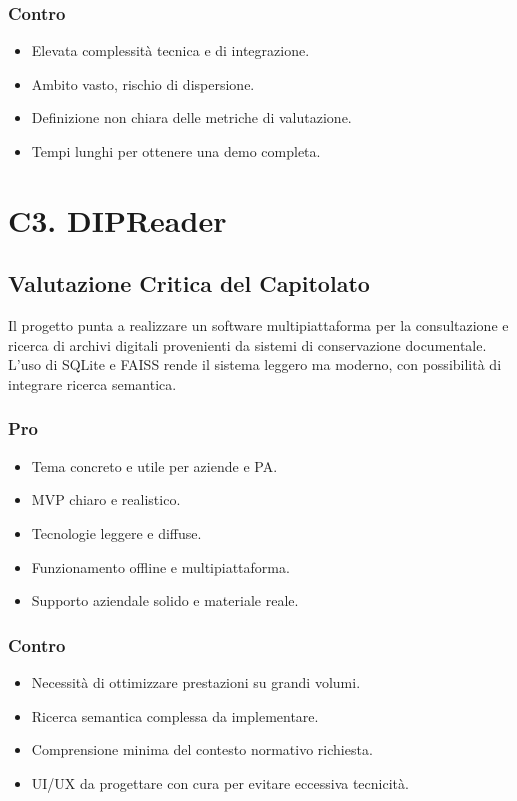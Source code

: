 \documentclass[a4paper, 11pt, oneside]{scrartcl} %
\begin{document}
\subsubsection*{Contro}
\begin{itemize}
    \item Elevata complessità tecnica e di integrazione.
    \item Ambito vasto, rischio di dispersione.
    \item Definizione non chiara delle metriche di valutazione.
    \item Tempi lunghi per ottenere una demo completa.
\end{itemize}

\section{C3. DIPReader}
\subsection*{Valutazione Critica del Capitolato}
Il progetto punta a realizzare un software multipiattaforma per la consultazione e ricerca di archivi digitali provenienti da sistemi di conservazione documentale.\\
L’uso di SQLite e FAISS rende il sistema leggero ma moderno, con possibilità di integrare ricerca semantica.

\subsubsection*{Pro}
\begin{itemize}
    \item Tema concreto e utile per aziende e PA.
    \item MVP chiaro e realistico.
    \item Tecnologie leggere e diffuse.
    \item Funzionamento offline e multipiattaforma.
    \item Supporto aziendale solido e materiale reale.
\end{itemize}

\subsubsection*{Contro}
\begin{itemize}
    \item Necessità di ottimizzare prestazioni su grandi volumi.
    \item Ricerca semantica complessa da implementare.
    \item Comprensione minima del contesto normativo richiesta.
    \item UI/UX da progettare con cura per evitare eccessiva tecnicità.
\end{itemize}
\end{document}
